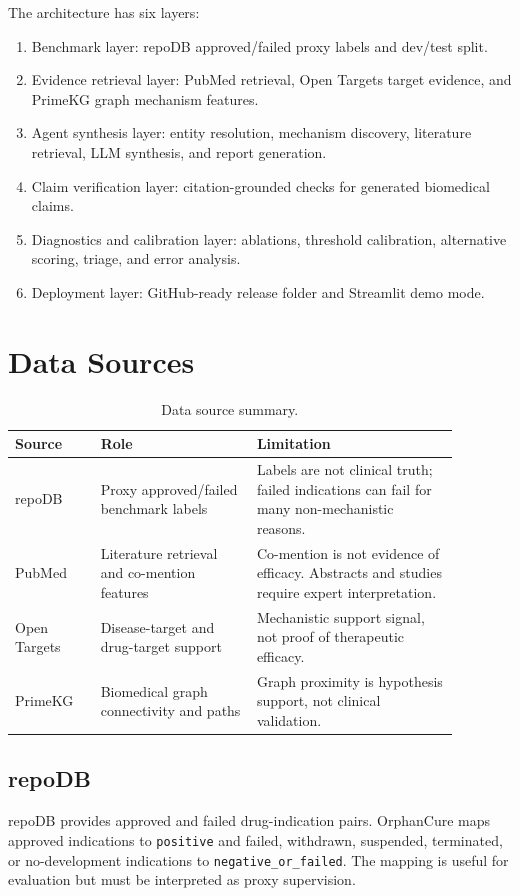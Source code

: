 \documentclass[11pt]{article}
\begin{document}
The architecture has six layers:
\begin{enumerate}
  \item Benchmark layer: repoDB approved/failed proxy labels and dev/test split.
  \item Evidence retrieval layer: PubMed retrieval, Open Targets target evidence, and PrimeKG graph mechanism features.
  \item Agent synthesis layer: entity resolution, mechanism discovery, literature retrieval, LLM synthesis, and report generation.
  \item Claim verification layer: citation-grounded checks for generated biomedical claims.
  \item Diagnostics and calibration layer: ablations, threshold calibration, alternative scoring, triage, and error analysis.
  \item Deployment layer: GitHub-ready release folder and Streamlit demo mode.
\end{enumerate}

\section{Data Sources}
\begin{table}[htbp]
\centering
\caption{Data source summary.}
\begin{tabular}{p{0.17\linewidth}p{0.31\linewidth}p{0.40\linewidth}}
\toprule
Source & Role & Limitation \\
\midrule
repoDB & Proxy approved/failed benchmark labels & Labels are not clinical truth; failed indications can fail for many non-mechanistic reasons. \\
PubMed & Literature retrieval and co-mention features & Co-mention is not evidence of efficacy. Abstracts and studies require expert interpretation. \\
Open Targets & Disease-target and drug-target support & Mechanistic support signal, not proof of therapeutic efficacy. \\
PrimeKG & Biomedical graph connectivity and paths & Graph proximity is hypothesis support, not clinical validation. \\
\bottomrule
\end{tabular}
\end{table}

\subsection{repoDB}
repoDB provides approved and failed drug-indication pairs. OrphanCure maps approved indications to \texttt{positive} and failed, withdrawn, suspended, terminated, or no-development indications to \texttt{negative\_or\_failed}. The mapping is useful for evaluation but must be interpreted as proxy supervision.
\end{document}
